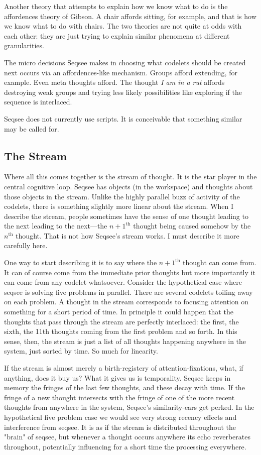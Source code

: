 \documentclass[letterpaper]{article}
\begin{document}
 Another theory that attempts to explain how we know what to do is the affordences theory of Gibson. A chair affords sitting, for example, and that is how we know what to do with chairs.  The two theories are not quite at odds with each other: they are just trying to explain similar phenomena at different granularities.

The micro decisions Seqsee makes in choosing what codelets should be created next occurs via an affordences-like mechanism. Groups afford extending, for example.  Even meta thoughts afford.  The thought \emph{I am in a rut} affords destroying weak groups and trying less likely possibilities like exploring if the sequence is interlaced.

Seqsee does not currently use scripts.  It is conceivable that something similar may be called for. 

\subsection{The Stream}
\label{sec:stream}

Where all this comes together is the stream of thought.  It is the star player in the central cognitive loop.  Seqsee has objects (in the workspace) and thoughts about those objects in the stream.  Unlike the highly parallel buzz of activity of the codelets, there is something slightly more linear about the stream.  When I describe the stream, people sometimes have the sense of one thought leading to the next leading to the next---the $n+1^{\mathrm{th}}$ thought being caused somehow by the $n^\mathrm{th}$ thought.  That is not how Seqsee's stream works.  I must describe it more carefully here.

One way to start describing it is to say where the $n+1^{\mathrm{th}}$ thought can come from.  It can of course come  from the immediate prior thoughts but more importantly it can come from any codelet whatsoever.  Consider the hypothetical case where seqsee is solving five problems in parallel.  There are several codelets toiling away on each problem.  A thought in the stream corresponds to focusing attention on something for a short period of time.  In principle it could happen that the thoughts that pass through the stream are perfectly interlaced: the first, the sixth, the 11th thoughts coming from the first problem and so forth.  In this sense, then, the stream is just a list of all thoughts happening anywhere in the system, just sorted by time.  So much for linearity.

If the stream is almost merely a birth-registery of attention-fixations, what, if anything, does it buy us? What it gives us is temporality.  Seqsee keeps in memory the fringes of the last few thoughts, and these decay with time.  If the fringe of a new thought intersects with the fringe of one of the more recent thoughts from anywhere in the system, Seqsee's similarity-ears get perked.  In the hypothetical five problem case we would see very strong recency effects and interference from seqsee.  It is as if the stream is distributed throughout the "brain" of seqsee, but whenever a thought occurs anywhere its echo reverberates throughout, potentially influencing for a short time the processing everywhere.
\end{document}
